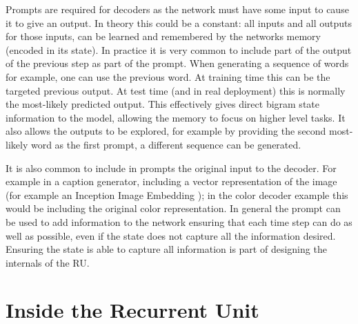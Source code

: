 \documentclass[12pt,parskip]{komatufte}
\begin{document}

Prompts are required for decoders as the network must have some input to cause it to give an output.
In theory this could be a constant: all inputs and all outputs for those inputs, can be learned and remembered by the networks memory (encoded in its state).
In practice it is very common to include part of the output of the previous step as part of the prompt.
When generating a sequence of words for example, one can use the previous word.
At training time this can be the targeted previous output.
At test time (and in real deployment) this is normally the most-likely predicted output.
This effectively gives direct bigram state information to the model,
allowing the memory to focus on higher level tasks.
It also allows the outputs to be explored, for example by providing the second most-likely word as the first prompt, a different sequence can be generated.

It is also common to include in prompts the original input to the decoder.
For example in a caption generator, including a vector representation of the image (for example an Inception Image Embedding ); in the color decoder example this would be including the original color representation.
In general the prompt can be used to add information to the network ensuring that each time step can do as well as possible, even if the state does not capture all the information desired.
Ensuring the state is able to capture all information is part of designing the internals of the RU.


\section{Inside the Recurrent Unit}


\end{document}

